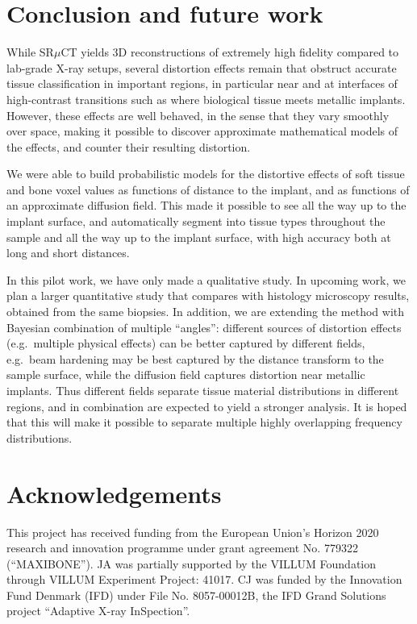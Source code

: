 \section{Conclusion and future work}
\label{sec:conclusion}

While SR$\mu$CT yields 3D reconstructions of extremely high fidelity compared to lab-grade X-ray setups,
several distortion effects remain that obstruct accurate tissue classification in important regions, in particular
near and at interfaces of high-contrast transitions such as where biological tissue meets metallic implants.
However, these effects are well behaved, in the sense that they vary smoothly over space, making it possible
to discover approximate mathematical models of the effects, and counter their resulting distortion.

We were able to build probabilistic models for the distortive effects
of soft tissue and bone voxel values as functions of distance to the
implant, and as functions of an approximate diffusion field. This made
it possible to see all the way up to the implant surface, and
automatically segment into tissue types throughout the sample and all
the way up to the implant surface, with high accuracy both at long and
short distances.

In this pilot work, we have only made a qualitative study. In upcoming
work, we plan a larger quantitative study that compares with histology
microscopy results, obtained from the same biopsies.  In addition, we
are extending the method with Bayesian combination of multiple
``angles'': different sources of distortion effects (e.g.~multiple
physical effects) can be better captured by different fields,
e.g.~beam hardening may be best captured by the distance transform to
the sample surface, while the diffusion field captures distortion near
metallic implants. Thus different fields separate tissue material
distributions in different regions, and in combination are expected to
yield a stronger analysis. It is hoped that this will make it possible
to separate multiple highly overlapping frequency distributions.



\section{Acknowledgements}

This project has received funding from the European Union’s Horizon 2020 research and innovation programme under grant agreement No. 779322 (``MAXIBONE'').
JA was partially supported by the VILLUM Foundation through VILLUM Experiment Project: 41017.
CJ was funded by the Innovation Fund Denmark (IFD) under File No. 8057-00012B, the IFD Grand Solutions project ``Adaptive X-ray InSpection''.


